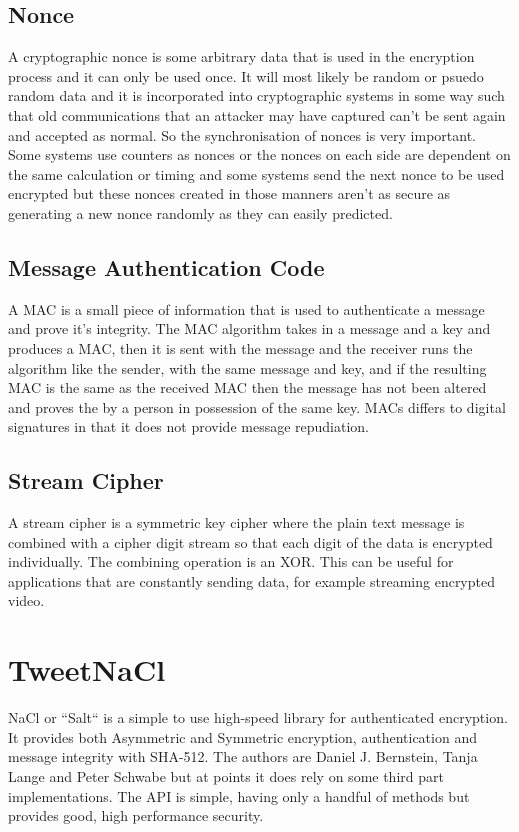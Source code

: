 \subsection{Nonce}

A cryptographic nonce is some arbitrary data that is used in the encryption process and it can only be used once. It will most likely be random or psuedo random data and it is incorporated into cryptographic systems in some way such that old communications that an attacker may have captured can't be sent again and accepted as normal. So the synchronisation of nonces is very important. Some systems use counters as nonces or the nonces on each side are dependent on the same calculation or timing and some systems send the next nonce to be used encrypted but these nonces created in those manners aren't as secure as generating a new nonce randomly as they can easily predicted. 

\subsection{Message Authentication Code}

A MAC is a small piece of information that is used to authenticate a message and prove it's integrity. The MAC algorithm takes in a message and a key and produces a MAC, then it is sent with the message and the receiver runs the algorithm like the sender, with the same message and key, and if the resulting MAC is the same as the received MAC then the message has not been altered and proves the by a person in possession of the same key. MACs differs to digital signatures in that it does not provide message repudiation.

\subsection{Stream Cipher}

A stream cipher is a symmetric key cipher where the plain text message is combined with a cipher digit stream so that each digit of the data is encrypted individually. The combining operation is an XOR. This can be useful for applications that are constantly sending data, for example streaming encrypted video. 

\section{TweetNaCl}

NaCl or ``Salt`` is a simple to use high-speed library for authenticated encryption. It provides both Asymmetric and Symmetric encryption, authentication and message integrity with SHA-512. The authors are Daniel J. Bernstein, Tanja Lange and Peter Schwabe but at points it does rely on some third part implementations. The API is simple, having only a handful of methods but provides good, high performance security.

